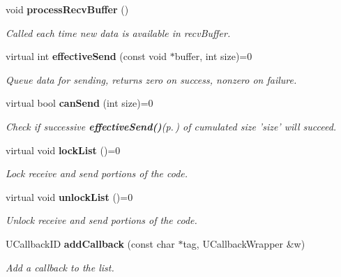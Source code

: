 \begin{CompactItemize}
\item 
void {\bf process\-Recv\-Buffer} ()
\begin{CompactList}\small\item\em Called each time new data is available in recv\-Buffer. \item\end{CompactList}\item 
virtual int {\bf effective\-Send} (const void $\ast$buffer, int size)=0\label{classUAbstractClient_b1}

\begin{CompactList}\small\item\em Queue data for sending, returns zero on success, nonzero on failure. \item\end{CompactList}\item 
virtual bool {\bf can\-Send} (int size)=0\label{classUAbstractClient_b2}

\begin{CompactList}\small\item\em Check if successive {\bf effective\-Send()}{\rm (p.\,\pageref{classUAbstractClient_b1})} of cumulated size 'size' will succeed. \item\end{CompactList}\item 
virtual void {\bf lock\-List} ()=0\label{classUAbstractClient_b3}

\begin{CompactList}\small\item\em Lock receive and send portions of the code. \item\end{CompactList}\item 
virtual void {\bf unlock\-List} ()=0\label{classUAbstractClient_b4}

\begin{CompactList}\small\item\em Unlock receive and send portions of the code. \item\end{CompactList}\item 
UCallback\-ID {\bf add\-Callback} (const char $\ast$tag, UCallback\-Wrapper \&w)\label{classUAbstractClient_b5}

\begin{CompactList}\small\item\em Add a callback to the list. \item\end{CompactList}\end{CompactItemize}
